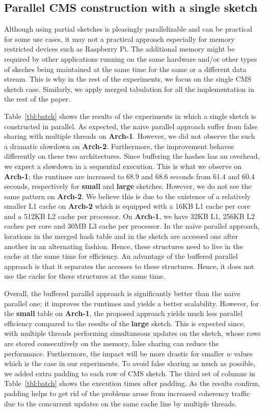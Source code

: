 \documentclass[10pt, conference, compsocconf]{IEEEtran}
\begin{document}
\subsection{Parallel CMS construction with a single sketch}

Although using partial sketches is pleasingly parallelizable and can be practical for some use cases, it may not a practical approach especially for memory restricted devices such as Raspberry Pi. The additional memory might be required by other applications running on the same hardware and/or other types of skeches being maintained at the same time for the same or a different data stream. This is why in the rest of the experiments, we focus on the single CMS sketch case. Similarly, we apply merged tabulation for all the implementation in the rest of the paper.  

Table~\ref{tbl:batch} shows the results of the experiments in which a single sketch is constructed in parallel. As expected, the naive parallel approach suffer from false sharing with multiple threads on {\bf Arch-1}. However, we did not observe the such a dramatic slowdown on {\bf Arch-2}. Furthermore, the improvement behaves differently on these two architectures. Since buffering the hashes has an overhead, we expect a slowdown in a sequential execution. This is what we observe on {\bf Arch-1}; the runtimes are increased to  68.9 and 68.6 seconds from 61.4 and
 60.4 seconds, respectively for {\bf small} and {\bf large} sketches. However, we do not see the same pattern on {\bf Arch-2}.
We believe this is due to the existence of a relatively smaller L1 cache on {\bf Arch-2} which is equipped with a 16KB L1 cache per core and a 512KB L2 cache per processor. On {\bf Arch-1}, we have 32KB L1, 256KB L2 caches per core and 30MB L3 cache per processor. In the naive parallel approach, locations in the merged hash table and in the sketch are accessed one after another in an alternating fashion. Hence, these structures need to live in the cache at the same time for efficiency. An advantage of the buffered parallel approach is that it separates the accesses to these structures. Hence, it does not use the cache for these structures at the same time. 

Overall, the buffered parallel approach is significantly better than the naive parallel one; it improves the runtimes and yields a better scalability. However, for the {\bf small} table on {\bf Arch-1}, the proposed approach yields much less parallel efficiency compared to the results of the {\bf large} sketch. This is expected since, with multiple threads performing simultaneous updates on the sketch, whose rows are stored consecutively on the memory, false sharing can reduce the performance. Furthermore, the impact will be more drastic for smaller $w$ values which is the case in our experiments. To avoid false sharing as much as possible, we added extra padding to each row of CMS sketch. The third set of columns in Table~\ref{tbl:batch} shows the execution times after padding. As the results confirm, padding helps to get rid of the problems arose from increased coherency traffic due to the concurrent updates on the same cache line by multiple threads. 
\end{document}
